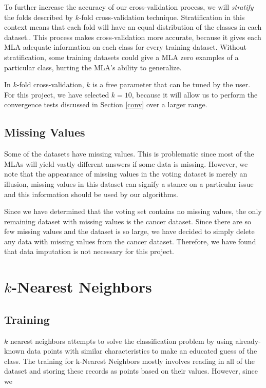 \documentclass{article}
\begin{document}
		To further increase the accuracy of our cross-validation process, we will \textit{stratify} the folds described by $k$-fold cross-validation technique. 
		Stratification in this context means that each fold will have an equal distribution of the classes in each dataset..
		This process makes cross-validation more accurate, because it gives each MLA adequate information on each class for every training dataset.
		Without stratification, some training datasets could give a MLA zero examples of a particular class, hurting the MLA's ability to generalize.
		
		In $k$-fold cross-validation, $k$ is a free parameter that can be tuned by the user. For this project, we have selected $k = 10$, because it will allow us to perform the convergence tests discussed in Section \ref{conv} over a larger range.
	
	\subsection{Missing Values}
	
		Some of the datasets have missing values. 
		This is problematic since most of the MLAs will yield vastly different answers if some data is missing. 
		However, we note that the appearance of missing values in the voting dataset is merely an illusion, missing values in this dataset can signify a stance on a particular issue and this information should be used by our algorithms. 
		
		Since we have determined that the voting set contains no missing values, the only remaining dataset with missing values is the cancer dataset. Since there are so few missing values and the dataset is so large, we have decided to simply delete any data with missing values from the cancer dataset. Therefore, we have found that data imputation is not necessary for this project. 
	
\section{$k$-Nearest Neighbors}
	\subsection{Training}
	
		$k$ nearest neighbors attempts to solve the classification problem by using already-known data points with similar characteristics to make an educated guess of the class.  The training for k-Nearest Neighbors mostly involves reading in all of the dataset and storing these records as points based on their values. However, since we 
	
\end{document}
